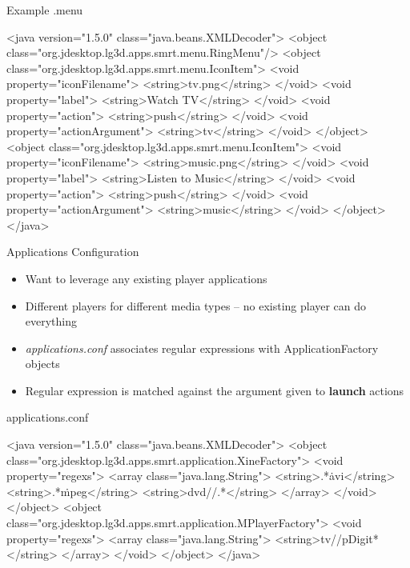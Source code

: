 \documentclass[style=smrt,mode=present,paper=screen]{powerdot}
\begin{document}
\begin{slide}[method=direct]{Example .menu}
\begin{code}
<java version="1.5.0" class="java.beans.XMLDecoder">
    <object class="org.jdesktop.lg3d.apps.smrt.menu.RingMenu"/>
    <object class="org.jdesktop.lg3d.apps.smrt.menu.IconItem">
        <void property="iconFilename">   <string>tv.png</string>   </void>
        <void property="label">          <string>Watch TV</string> </void>
        <void property="action">         <string>push</string>     </void>
        <void property="actionArgument"> <string>tv</string>       </void>
    </object>
    <object class="org.jdesktop.lg3d.apps.smrt.menu.IconItem">
        <void property="iconFilename">   <string>music.png</string> </void>
        <void property="label">
	    <string>Listen to Music</string>
	</void>
        <void property="action">         <string>push</string>      </void>
        <void property="actionArgument"> <string>music</string>     </void>
    </object>
</java>
\end{code}
\end{slide}

\begin{slide}{Applications Configuration}
\begin{itemize}
	\item Want to leverage any existing player applications
	\item Different players for different media types -- no existing player can do everything
	\item \textit{applications.conf} associates regular expressions with ApplicationFactory objects
	\item Regular expression is matched against the argument given to \textbf{launch} actions
\end{itemize}
\end{slide}

\begin{slide}[method=direct]{applications.conf}
\begin{code}
<java version="1.5.0" class="java.beans.XMLDecoder">
    <object class="org.jdesktop.lg3d.apps.smrt.application.XineFactory">
        <void property="regexs">
            <array class="java.lang.String">
                <string>.*\.avi</string>
                <string>.*\.mpeg</string>
                <string>dvd\://.*</string>
            </array>
        </void>
    </object>
    <object class="org.jdesktop.lg3d.apps.smrt.application.MPlayerFactory">
        <void property="regexs">
            <array class="java.lang.String">
                <string>tv\://p{Digit}*</string>
            </array>
        </void>
    </object>
</java>
\end{code}
\end{slide}
\end{document}
